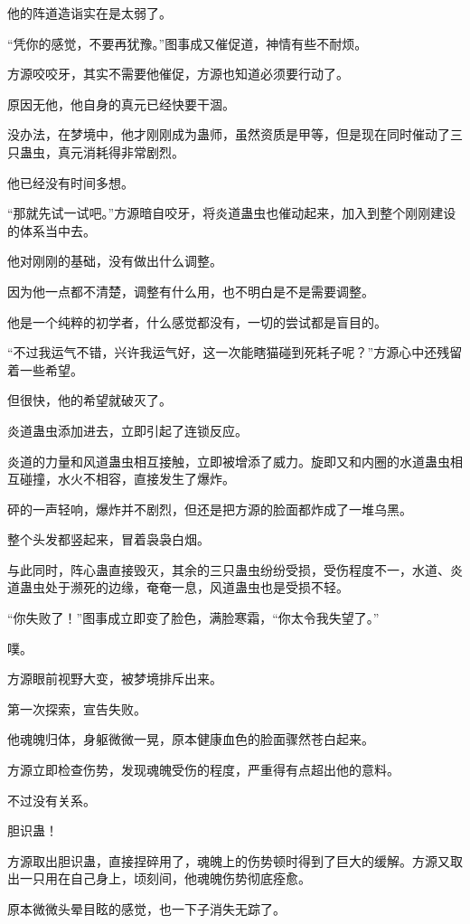 \begin{this_body}
他的阵道造诣实在是太弱了。

“凭你的感觉，不要再犹豫。”图事成又催促道，神情有些不耐烦。

方源咬咬牙，其实不需要他催促，方源也知道必须要行动了。

原因无他，他自身的真元已经快要干涸。

没办法，在梦境中，他才刚刚成为蛊师，虽然资质是甲等，但是现在同时催动了三只蛊虫，真元消耗得非常剧烈。

他已经没有时间多想。

“那就先试一试吧。”方源暗自咬牙，将炎道蛊虫也催动起来，加入到整个刚刚建设的体系当中去。

他对刚刚的基础，没有做出什么调整。

因为他一点都不清楚，调整有什么用，也不明白是不是需要调整。

他是一个纯粹的初学者，什么感觉都没有，一切的尝试都是盲目的。

“不过我运气不错，兴许我运气好，这一次能瞎猫碰到死耗子呢？”方源心中还残留着一些希望。

但很快，他的希望就破灭了。

炎道蛊虫添加进去，立即引起了连锁反应。

炎道的力量和风道蛊虫相互接触，立即被增添了威力。旋即又和内圈的水道蛊虫相互碰撞，水火不相容，直接发生了爆炸。

砰的一声轻响，爆炸并不剧烈，但还是把方源的脸面都炸成了一堆乌黑。

整个头发都竖起来，冒着袅袅白烟。

与此同时，阵心蛊直接毁灭，其余的三只蛊虫纷纷受损，受伤程度不一，水道、炎道蛊虫处于濒死的边缘，奄奄一息，风道蛊虫也是受损不轻。

“你失败了！”图事成立即变了脸色，满脸寒霜，“你太令我失望了。”

噗。

方源眼前视野大变，被梦境排斥出来。

第一次探索，宣告失败。

他魂魄归体，身躯微微一晃，原本健康血色的脸面骤然苍白起来。

方源立即检查伤势，发现魂魄受伤的程度，严重得有点超出他的意料。

不过没有关系。

胆识蛊！

方源取出胆识蛊，直接捏碎用了，魂魄上的伤势顿时得到了巨大的缓解。方源又取出一只用在自己身上，顷刻间，他魂魄伤势彻底痊愈。

原本微微头晕目眩的感觉，也一下子消失无踪了。


\end{this_body}
